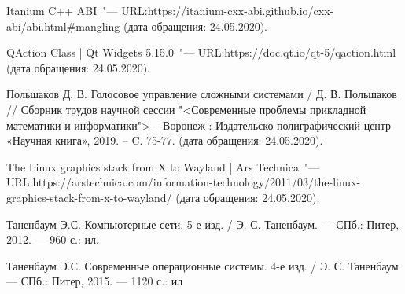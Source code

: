 \begin{thebibliography}{99}
 Itanium C++ ABI~"---
URL:\@ https://itanium-cxx-abi.github.io/cxx-abi/abi.html\allowbreak \#mangling
(дата обращения: 24.05.2020).

 QAction Class | Qt Widgets 5.15.0~"---
URL:\@ https://doc.qt.io/qt-5/qaction.html
(дата обращения: 24.05.2020).

Польшаков Д. В. Голосовое управление сложными системами / Д. В. Польшаков //
Сборник трудов научной сессии
"<Современные проблемы прикладной математики и информатики">
– Воронеж : Издательско-полиграфический
центр «Научная книга», 2019. – C. 75-77.
(дата обращения: 24.05.2020).

 The Linux graphics stack from X to Wayland | Ars Technica~"---
URL:\@ https://arstechnica.com/information-technology/2011/03/the-linux-graphics-stack-from-x-to-wayland/
(дата обращения: 24.05.2020).

 Таненбаум Э.С. Компьютерные сети. 5-е изд. / Э. С. Таненбаум. — СПб.: Питер, 2012. — 960 с.: ил.

 Таненбаум Э.С. Современные операционные системы. 4-е изд. / Э. С. Таненбаум — СПб.: Питер, 2015. — 1120 с.: ил

\end{thebibliography}
